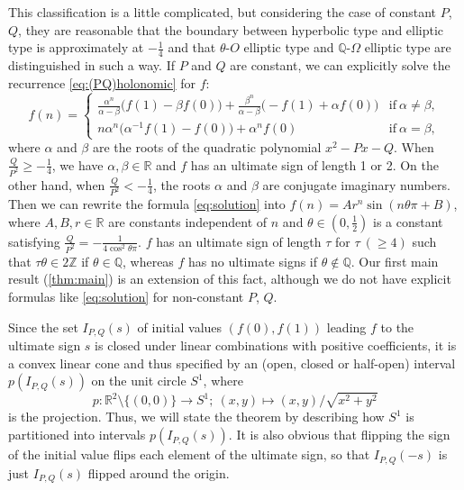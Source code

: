 \documentclass[a4paper,UKenglish,cleveref,autoref,thm-restate]{lipics-v2021}
\newcommand{\R}{\mathbb{R}}
\newcommand{\Q}{\mathbb{Q}}
\newcommand{\Z}{\mathbb{Z}}
\begin{document}
This classification is a little complicated, but considering the case of constant $P$, $Q$, they are reasonable that the boundary between hyperbolic type and elliptic type is approximately at $-\frac14$ and that $\theta$-$O$ elliptic type and $\Q$-$\Omega$ elliptic type are distinguished in such a way. 
If $P$ and $Q$ are constant, we can explicitly solve the recurrence \eqref{eq:(PQ)holonomic} for $f$: 
\begin{equation}
\label{eq:solution}
f(n)
=
\begin{cases}
\displaystyle \frac{\alpha^n}{\alpha - \beta} \bigl( f(1) - \beta f(0) \bigr) + \frac{\beta^n}{\alpha - \beta} \bigl( -f(1) + \alpha f(0) \bigr) & \text{if} \ \alpha \neq \beta, 
\\
n \alpha^n \bigl( \alpha^{-1} f(1) - f(0) \bigr) + \alpha^n f(0) & \text{if} \ \alpha = \beta, 
\end{cases}
\end{equation}
where $\alpha$ and $\beta$ are 
the roots of the quadratic polynomial $x^2 - P x - Q$. When $\frac{Q}{P^2} \geq -\frac14$, we have $\alpha, \beta \in \R$ and $f$ has an ultimate sign of length 1 or 2. On the other hand, when $\frac{Q}{P^2} < -\frac14$, the roots $\alpha$ and $\beta$ are conjugate imaginary numbers. Then we can rewrite the formula \eqref{eq:solution} into $f(n) = A r^n \sin (n \theta \pi + B)$, where $A, B, r \in \R$ are constants independent of $n$ and $\theta \in (0, \frac12)$ is a constant satisfying $\frac{Q}{P^2} = -\frac1{4 \cos^2 \theta \pi }$. $f$ has an ultimate sign of length $\tau$ for $\tau \ (\geq 4)$ such that $\tau \theta \in 2\Z$ if $\theta \in \Q$, whereas $f$ has no ultimate signs if $\theta \not\in \Q$. Our first main result (\cref{thm:main}) is an extension of this fact, although we do not have explicit formulas like \eqref{eq:solution} for non-constant $P$, $Q$.



Since the set $I _{P, Q} (s)$ of initial values $(f(0), f(1))$ leading $f$ to the ultimate sign $s$
is closed under linear combinations with positive coefficients, 
it is a convex linear cone and thus specified by 
an (open, closed or half-open) interval $p (I _{P, Q} (s))$ 
on the unit circle $S ^1$, where 
\begin{equation}\label{eq:projection}
p \colon \R^2 \setminus \{ (0, 0) \} \to S ^1 ; \ (x, y) \mapsto (x, y) / \sqrt{x^2 + y^2}
\end{equation}
is the projection. 
Thus, we will state the theorem by describing
how $S ^1$ is partitioned into intervals $p (I _{P, Q} (s))$. 
It is also obvious that flipping the sign of the initial value flips each element of the ultimate sign, so that $I_{P, Q} (-s)$ is just $I_{P, Q}(s)$ flipped around the origin. 
\end{document}
